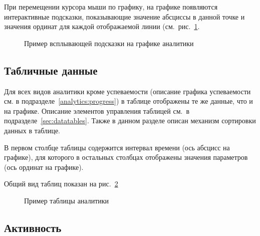 При перемещении курсора мыши по графику, на графике появляются интерактивные подсказки, показывающие
значение абсциссы в данной точке и значения ординат для каждой отображаемой линии (см.\ рис.~\ref{analytics:chart:tooltip}.

\begin{figure}[H]
	\caption{Пример всплывающей подсказки на графике аналитики}
	\label{analytics:chart:tooltip}
\end{figure}

\subsection{Табличные данные}
\label{analytics:tables}

Для всех видов аналитики кроме успеваемости (описание графика успеваемости см. в подразделе~\ref{analytics:progress})
в таблице отображены те же данные, что и на графике. 
Описание элементов управления таблицей см.\ в подразделе~\ref{sec:datatables}. Также в данном разделе описан механизм
сортировки данных в таблице. 

В первом столбце таблицы содержится интервал времени (ось абсцисс на графике), для которого в 
остальных столбцах отображены значения параметров (ось ординат на графике).

Общий вид таблиц показан на рис.~\ref{analytics:table}

\begin{figure}[H]
	\caption{Пример таблицы аналитики}
	\label{analytics:table}
\end{figure}

\subsection{Активность}
\label{analytics:activity}

